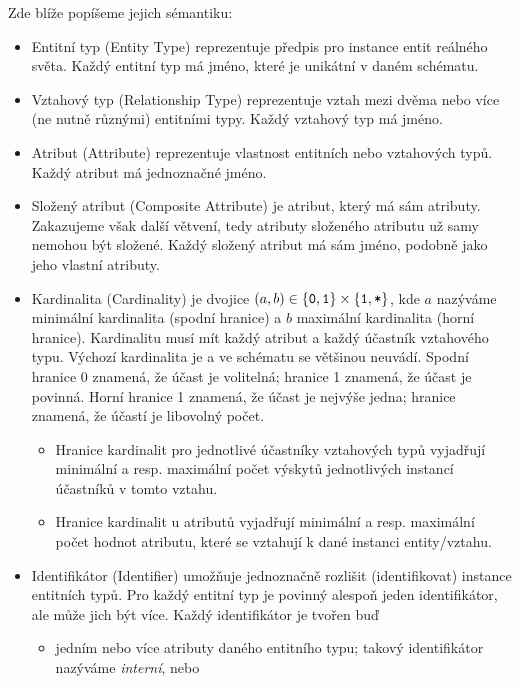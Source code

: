 Zde blíže popíšeme jejich sémantiku:
\begin{itemize}
  \item Entitní typ (Entity Type) reprezentuje předpis pro instance entit reálného světa.
        Každý entitní typ má jméno, které je unikátní v daném schématu.
  \item Vztahový typ (Relationship Type) reprezentuje vztah mezi dvěma nebo více (ne nutně různými) entitními typy.
        Každý vztahový typ má jméno.
  \item Atribut (Attribute) reprezentuje vlastnost entitních nebo vztahových typů.
        Každý atribut má jednoznačné jméno.
  \item Složený atribut (Composite Attribute) je atribut, který má sám atributy.
        Zakazujeme však další větvení, tedy atributy složeného atributu už samy nemohou být složené.
        Každý složený atribut má sám jméno, podobně jako jeho vlastní atributy.
  \item \label{def:cardinality}Kardinalita (Cardinality) je dvojice $(a, b) \in \left\{\texttt{0}, \texttt{1}\right\}\times \left\{\texttt{1}, \texttt{*}\right\}$, kde $a$ nazýváme minimální kardinalita (spodní hranice) a $b$ maximální kardinalita (horní hranice).
        Kardinalitu musí mít každý atribut a každý účastník vztahového typu.
        Výchozí kardinalita je \oneone{} a ve schématu se většinou neuvádí.
        Spodní hranice 0 znamená, že účast je volitelná; hranice 1 znamená, že účast je povinná.
        Horní hranice 1 znamená, že účast je nejvýše jedna; hranice~\many{} znamená, že účastí je libovolný počet.
        \begin{itemize}
          \item Hranice kardinalit pro jednotlivé účastníky vztahových typů vyjadřují minimální a resp. maximální počet výskytů jednotlivých instancí účastníků v tomto vztahu.
          \item Hranice kardinalit u atributů vyjadřují minimální a resp. maximální počet hodnot atributu, které se vztahují k dané instanci entity/vztahu.
        \end{itemize}
  \item Identifikátor (Identifier) umožňuje jednoznačně rozlišit (identifikovat) instance entitních typů.
        Pro každý entitní typ je povinný alespoň jeden identifikátor, ale může jich být více.
        Každý identifikátor je tvořen buď
        \begin{itemize}
          \item jedním nebo více atributy daného entitního typu; takový identifikátor nazýváme \emph{interní}, nebo

\end{itemize}
\end{itemize}
